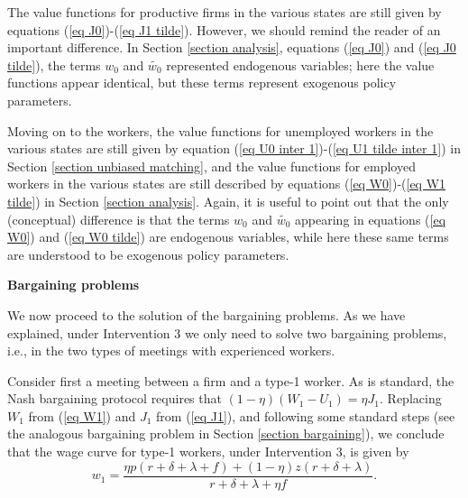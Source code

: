\documentclass[12pt]{article} %
\theoremstyle{definition}
\begin{document}
The value functions for productive firms in the various states are still given by equations (\ref{eq J0})-(\ref{eq J1 tilde}). 
However, we should remind the reader of an important difference. In Section \ref{section analysis}, equations (\ref{eq J0}) and (\ref{eq J0 tilde}), the terms $w_0$ and $\tilde{w_0}$ represented endogenous variables; here the value functions appear identical, but these terms represent exogenous policy parameters.   

Moving on to the workers, the value functions for unemployed workers in the various states are still given by equation (\ref{eq U0 inter 1})-(\ref{eq U1 tilde inter 1}) in Section \ref{section unbiased matching}, and the value functions for employed workers in the various states are still described by equations (\ref{eq W0})-(\ref{eq W1 tilde}) in Section \ref{section analysis}. Again, it is useful to point out that the only (conceptual) difference is that the terms $w_0$ and $\tilde{w_0}$ appearing in equations (\ref{eq W0}) and (\ref{eq W0 tilde}) are endogenous variables, while here these same terms are understood to be exogenous policy parameters.  


\bigskip 

\noindent \textbf{Bargaining problems}

\noindent We now proceed to the solution of the bargaining problems. As we have explained, under Intervention 3 we only need to solve two bargaining problems, i.e., in the two types of meetings with experienced workers. 

Consider first a meeting between a firm and a type-1 worker. As is standard, the Nash bargaining protocol requires that $(1-\eta)(W_1-U_1) = \eta J_1$. Replacing $W_1$ from (\ref{eq W1}) and $J_1$ from (\ref{eq J1}), and following some standard steps (see the analogous bargaining problem in Section \ref{section bargaining}), we conclude that the wage curve for type-1 workers, under Intervention 3, is given by
\begin{equation}
 w_1 = \frac{\eta p (r+\delta+\lambda+f)+(1-\eta)z(r+\delta+\lambda)}{r+\delta+\lambda + \eta f}.\label{eq wage curve 1 inter 3}    
\end{equation}
\end{document}
